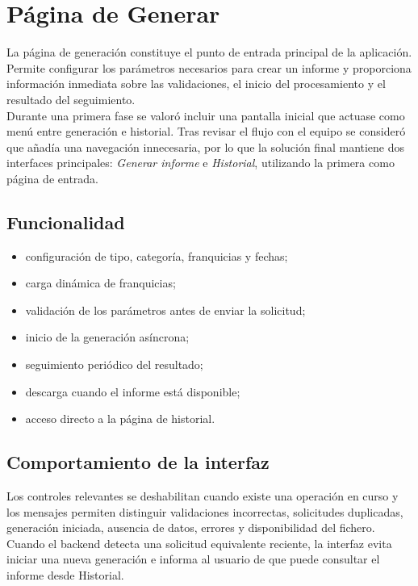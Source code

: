 \documentclass[11pt,a4paper,titlepage,oneside]{report}
\begin{document}
\section{Página de Generar}

La página de generación constituye el punto de entrada principal de la
aplicación. Permite configurar los parámetros necesarios para crear un informe
y proporciona información inmediata sobre las validaciones, el inicio del
procesamiento y el resultado del seguimiento. \\

Durante una primera fase se valoró incluir una pantalla inicial que actuase
como menú entre generación e historial. Tras revisar el flujo con el equipo se
consideró que añadía una navegación innecesaria, por lo que la solución final
mantiene dos interfaces principales: \textit{Generar informe} e
\textit{Historial}, utilizando la primera como página de entrada.

\subsection{Funcionalidad}

\begin{itemize}
  \item configuración de tipo, categoría, franquicias y fechas;
  \item carga dinámica de franquicias;
  \item validación de los parámetros antes de enviar la solicitud;
  \item inicio de la generación asíncrona;
  \item seguimiento periódico del resultado;
  \item descarga cuando el informe está disponible;
  \item acceso directo a la página de historial.
\end{itemize}

\subsection{Comportamiento de la interfaz}

Los controles relevantes se deshabilitan cuando existe una operación en curso
y los mensajes permiten distinguir validaciones incorrectas, solicitudes
duplicadas, generación iniciada, ausencia de datos, errores y disponibilidad
del fichero. \\

Cuando el backend detecta una solicitud equivalente reciente, la interfaz evita
iniciar una nueva generación e informa al usuario de que puede consultar el
informe desde Historial.
\end{document}
